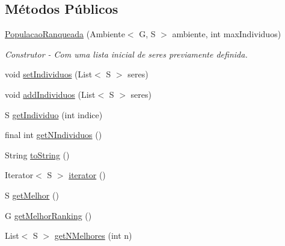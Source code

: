 \subsection*{Métodos Públicos}
\begin{DoxyCompactItemize}
\item 
\hyperlink{classic_1_1populacional_1_1_populacao_ranqueada_3_01_g_01extends_01_number_01_6_comparable_3_01_28759d4aa74a34b36c817c3168372e54_ae0fd4f544fa1bedaef07d8ed8c1ea6f5}{Populacao\-Ranqueada} (Ambiente$<$ G, S $>$ ambiente, int max\-Individuos)
\begin{DoxyCompactList}\small\item\em Construtor -\/ Com uma lista inicial de {\ttfamily seres} previamente definida. \end{DoxyCompactList}\item 
void \hyperlink{classic_1_1populacional_1_1_populacao_ranqueada_3_01_g_01extends_01_number_01_6_comparable_3_01_28759d4aa74a34b36c817c3168372e54_aafe0cbb0ddd12088bd4a4b467fb27aac}{set\-Individuos} (List$<$ S $>$ seres)
\item 
void \hyperlink{classic_1_1populacional_1_1_populacao_ranqueada_3_01_g_01extends_01_number_01_6_comparable_3_01_28759d4aa74a34b36c817c3168372e54_adf33e8433d20284205dde4d8a01527ec}{add\-Individuos} (List$<$ S $>$ seres)
\item 
S \hyperlink{classic_1_1populacional_1_1_populacao_ranqueada_3_01_g_01extends_01_number_01_6_comparable_3_01_28759d4aa74a34b36c817c3168372e54_ae1abf9f3521312d0d890de91c1df0b51}{get\-Individuo} (int indice)
\item 
final int \hyperlink{classic_1_1populacional_1_1_populacao_ranqueada_3_01_g_01extends_01_number_01_6_comparable_3_01_28759d4aa74a34b36c817c3168372e54_aa6fdb755bfdd892491f667d9d61991e9}{get\-N\-Individuos} ()
\item 
String \hyperlink{classic_1_1populacional_1_1_populacao_ranqueada_3_01_g_01extends_01_number_01_6_comparable_3_01_28759d4aa74a34b36c817c3168372e54_a6d3e737f785ae59edd0441541f6d402e}{to\-String} ()
\item 
Iterator$<$ S $>$ \hyperlink{classic_1_1populacional_1_1_populacao_ranqueada_3_01_g_01extends_01_number_01_6_comparable_3_01_28759d4aa74a34b36c817c3168372e54_aa3b3ae3d12e35657306db4ff1f96a0af}{iterator} ()
\item 
S \hyperlink{classic_1_1populacional_1_1_populacao_ranqueada_3_01_g_01extends_01_number_01_6_comparable_3_01_28759d4aa74a34b36c817c3168372e54_a40710a622d3cedb7cb13312a0d72c2c4}{get\-Melhor} ()
\item 
G \hyperlink{classic_1_1populacional_1_1_populacao_ranqueada_3_01_g_01extends_01_number_01_6_comparable_3_01_28759d4aa74a34b36c817c3168372e54_a672321f7f86c443cdb38b5e6afee991b}{get\-Melhor\-Ranking} ()
\item 
List$<$ S $>$ \hyperlink{classic_1_1populacional_1_1_populacao_ranqueada_3_01_g_01extends_01_number_01_6_comparable_3_01_28759d4aa74a34b36c817c3168372e54_a1172673074a15788eda620b832930aa3}{get\-N\-Melhores} (int n)
\end{DoxyCompactItemize}


